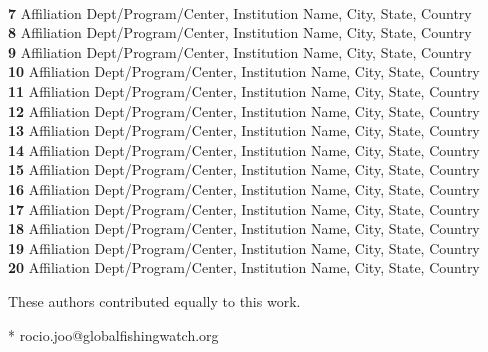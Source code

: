 \documentclass[10pt,letterpaper]{article}
\begin{document}
\begin{flushleft}
\\
\textbf{7} Affiliation Dept/Program/Center, Institution Name, City, State, Country
\\
\textbf{8} Affiliation Dept/Program/Center, Institution Name, City, State, Country
\\
\textbf{9} Affiliation Dept/Program/Center, Institution Name, City, State, Country
\\
\textbf{10} Affiliation Dept/Program/Center, Institution Name, City, State, Country
\\
\textbf{11} Affiliation Dept/Program/Center, Institution Name, City, State, Country
\\
\textbf{12} Affiliation Dept/Program/Center, Institution Name, City, State, Country
\\
\textbf{13} Affiliation Dept/Program/Center, Institution Name, City, State, Country
\\
\textbf{14} Affiliation Dept/Program/Center, Institution Name, City, State, Country
\\
\textbf{15} Affiliation Dept/Program/Center, Institution Name, City, State, Country
\\
\textbf{16} Affiliation Dept/Program/Center, Institution Name, City, State, Country
\\
\textbf{17} Affiliation Dept/Program/Center, Institution Name, City, State, Country
\\
\textbf{18} Affiliation Dept/Program/Center, Institution Name, City, State, Country
\\
\textbf{19} Affiliation Dept/Program/Center, Institution Name, City, State, Country
\\
\textbf{20} Affiliation Dept/Program/Center, Institution Name, City, State, Country
\\
\bigskip

% 
%
\Yinyang These authors contributed equally to this work.




* rocio.joo@globalfishingwatch.org

\end{flushleft}
\end{document}
